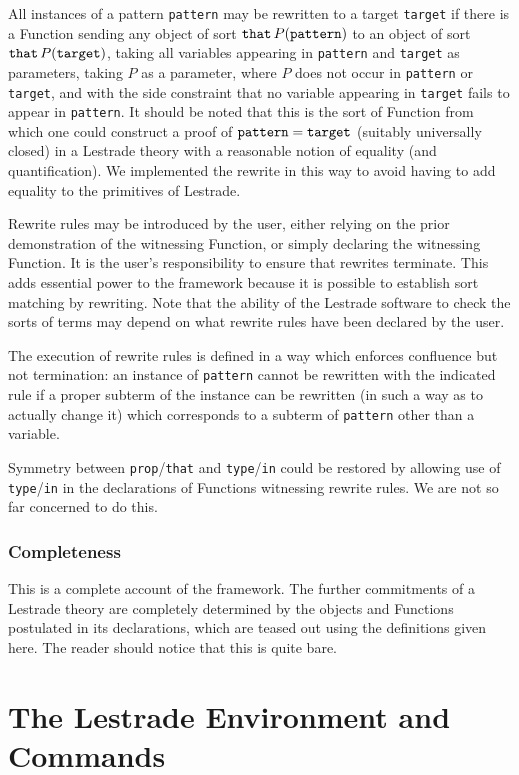 \documentclass[12pt]{article}
\begin{document}
All instances of a pattern {\tt pattern} may be rewritten to a target {\tt target} if there is a Function sending any object of sort ${\tt that}\, P({\tt pattern})$ to an object of sort ${\tt that} \, P({\tt target})$,
taking all variables appearing in {\tt pattern} and {\tt target} as parameters, taking $P$ as a parameter, where $P$ does not occur in {\tt pattern} or {\tt target}, and with the side constraint that no variable appearing in {\tt target} fails to appear in {\tt pattern}.  It should be noted that this is the sort of Function from which one could construct a proof of ${\tt pattern}={\tt target}$ (suitably universally closed)  in a Lestrade theory with a reasonable  notion of equality (and quantification).  We implemented the rewrite in this way to avoid having to add equality to the primitives of Lestrade.

Rewrite rules may be introduced by the user, either relying on the prior demonstration of the witnessing Function, or simply declaring the witnessing Function.  It is the user's responsibility to ensure that rewrites terminate.  This adds essential power to the framework because it is possible to establish sort matching by rewriting.  Note that the ability of the Lestrade software to check the sorts of terms may depend on what rewrite rules have been declared by the user.

The execution of rewrite rules is defined in a way which enforces confluence but not termination:  an instance of {\tt pattern} cannot be rewritten with the indicated rule if a proper subterm of the instance can be rewritten (in such a way as to actually change it) which corresponds to a subterm of {\tt pattern} other than a variable.

Symmetry between {\tt prop}/{\tt that} and {\tt type}/{\tt in} could be restored by allowing use of {\tt type}/{\tt in} in the declarations of Functions witnessing rewrite rules.  We are not so far concerned to do this.

\subsubsection{Completeness}  This is a complete account of the framework.  The further commitments of a Lestrade theory are completely determined by the objects and Functions postulated in its declarations, which are teased out using the definitions given here.  The reader should notice that this is quite bare.


\newpage

\section{The Lestrade Environment and Commands}
\end{document}
